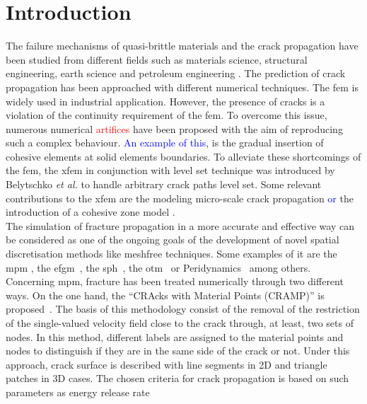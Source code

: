 \documentclass[preprint,12pt,a4paper]{elsarticle}
\begin{document}
\section{Introduction}
\label{sec:1}
The failure mechanisms of quasi-brittle materials and the  crack propagation have been studied from different fields such as materials science, structural engineering, earth science and petroleum engineering . The prediction of crack propagation has been approached with different numerical techniques. The \acrfull{fem} is widely used in industrial application. However, the presence of cracks is a violation of the continuity requirement of the \acrshort{fem}. To overcome this issue, numerous numerical \textcolor{red}{artifices} have been proposed with the aim of reproducing such a
complex behaviour. \textcolor{blue}{An example of this}, is the gradual insertion of
cohesive elements \cite{Ortiz_1999} at solid elements boundaries. To alleviate these shortcomings of the \acrshort{fem}, the \acrfull{xfem} in conjunction with level set
technique was introduced by Belytschko {\it et al.}
\cite{Belytschko_03} to handle arbitrary crack paths level
set. Some relevant contributions to the \acrshort{xfem} are the
modeling micro-scale crack propagation \cite{HUANG_2018} \textcolor{blue}{or} the
introduction of a cohesive zone model \cite{NAGASHIMA_2016}.\\
The simulation of fracture propagation in a more accurate and effective
way can be considered as one of the ongoing goals of the development of novel spatial discretisation methods like meshfree techniques. Some
examples of it are the \acrfull{mpm}
\cite{Schreyer_2002,Nairn_2003,NAIRN_2018}, the
\acrfull{efgm}~\cite{BELYTSCHKO_1995b,BELYTSCHKO_2000}, the
\acrfull{sph}~\cite{Wang_2020,Wang_2019}, the \acrfull{otm}~\cite{Pandolfi_2013,Li_2015} or Peridynamics~\cite{HA_2011,RABCZUK_2017} among others.\\
Concerning \acrshort{mpm}, fracture has been treated numerically through two different ways. On the one hand, the ``CRAcks with Material Points (CRAMP)'' is proposed~\cite{Nairn_2003}. The basis of this methodology consist of the removal of the restriction
of the single-valued velocity field close to the crack through, at least, two sets of nodes. In this method, different labels are assigned to the material points
and nodes to distinguish if they are in the same side of the crack or
not. Under this approach, crack surface is described with line segments
in 2D and triangle patches in 3D cases. The chosen criteria for crack
propagation is based on such parameters as energy release rate
\end{document}
